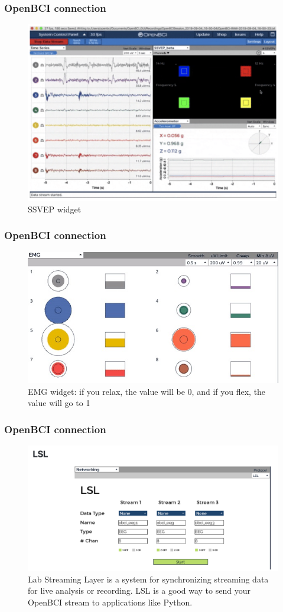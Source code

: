 \documentclass{beamer}
\begin{document}
\begin{frame}
\frametitle{OpenBCI connection}
\begin{figure}
	\includegraphics[width=0.7\linewidth]{image/ssvep2}
	\caption{SSVEP widget}
\end{figure}
\end{frame}

\begin{frame}
\frametitle{OpenBCI connection}
\begin{figure}
	\includegraphics[width=0.7\linewidth]{image/emgwid}
	\caption{EMG widget:  if you relax, the value will be 0, and if you flex, the value will go to 1}
\end{figure}
\end{frame}

\begin{frame}
\frametitle{OpenBCI connection}
\begin{figure}
	\includegraphics[width=0.7\linewidth]{image/lsl}
	\caption{Lab Streaming Layer is a system for synchronizing streaming data for live analysis or recording.   LSL is a good way to send your OpenBCI stream to applications like Python.}
\end{figure}
\end{frame}
\end{document}
